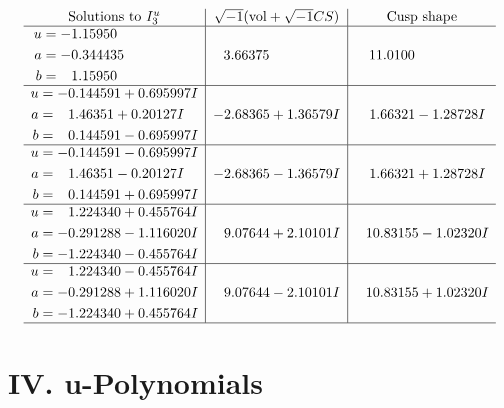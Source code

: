 \documentclass[1p]{elsarticle_modified}
\theoremstyle{definition}
\newcommand{\I}{\sqrt{-1}}
\begin{document}
$$\begin{array}{c|c|c}  
\text{Solutions to }I^u_{3}& \I (\text{vol} + \sqrt{-1}CS) & \text{Cusp shape}\\
 \hline 
\begin{aligned}
u &= -1.15950\phantom{ +0.000000I} \\
a &= -0.344435\phantom{ +0.000000I} \\
b &= \phantom{-}1.15950\phantom{ +0.000000I}\end{aligned}
 & \phantom{-}3.66375\phantom{ +0.000000I} & \phantom{-}11.0100\phantom{ +0.000000I} \\ \hline\begin{aligned}
u &= -0.144591 + 0.695997 I \\
a &= \phantom{-}1.46351 + 0.20127 I \\
b &= \phantom{-}0.144591 - 0.695997 I\end{aligned}
 & -2.68365 + 1.36579 I & \phantom{-}1.66321 - 1.28728 I \\ \hline\begin{aligned}
u &= -0.144591 - 0.695997 I \\
a &= \phantom{-}1.46351 - 0.20127 I \\
b &= \phantom{-}0.144591 + 0.695997 I\end{aligned}
 & -2.68365 - 1.36579 I & \phantom{-}1.66321 + 1.28728 I \\ \hline\begin{aligned}
u &= \phantom{-}1.224340 + 0.455764 I \\
a &= -0.291288 - 1.116020 I \\
b &= -1.224340 - 0.455764 I\end{aligned}
 & \phantom{-}9.07644 + 2.10101 I & \phantom{-}10.83155 - 1.02320 I \\ \hline\begin{aligned}
u &= \phantom{-}1.224340 - 0.455764 I \\
a &= -0.291288 + 1.116020 I \\
b &= -1.224340 + 0.455764 I\end{aligned}
 & \phantom{-}9.07644 - 2.10101 I & \phantom{-}10.83155 + 1.02320 I\\
 \hline 
 \end{array}$$\newpage
\newpage\renewcommand{\arraystretch}{1}
\centering \section*{ IV. u-Polynomials}
\end{document}
